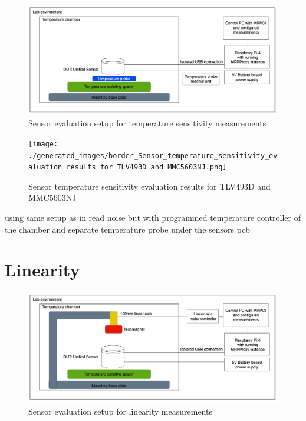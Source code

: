 \begin{figure}
\centering
\includegraphics{./generated_images/border_Sensor_evaluation_setup_for_temperature_sensitivity_measurements.png}
\caption{Sensor evaluation setup for temperature sensitivity
measurements
\label{Sensor_evaluation_setup_for_temperature_sensitivity_measurements.png}}
\end{figure}

\begin{figure}
\centering
\texttt{[image: ./generated\_images/border\_Sensor\_temperature\_sensitivity\_evaluation\_results\_for\_TLV493D\_and\_MMC5603NJ.png]}
\caption{Sensor temperature sensitivity evaluation results for TLV493D
and MMC5603NJ
\label{Sensor_temperature_sensitivity_evaluation_results_for_TLV493D_and_MMC5603NJ.png}}
\end{figure}

using same setup as in read noise but with programmed temperature
controller of the chamber and separate temperature probe under the
sensors pcb

\hypertarget{linearity}{%
\section{Linearity}\label{linearity}}

\begin{figure}
\centering
\includegraphics{./generated_images/border_Sensor_evaluation_setup_for_linearity_measurements.png}
\caption{Sensor evaluation setup for linearity measurements
\label{Sensor_evaluation_setup_for_linearity_measurements.png}}
\end{figure}

